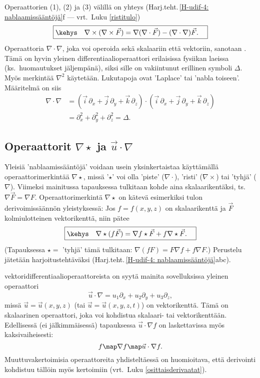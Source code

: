 Operaattorien (1), (2) ja (3) välillä on yhteys
(Harj.teht.\,\ref{H-udif-4: nablaamissääntöjä}f --- vrt.\ Luku \ref{ristitulo})
\[
\boxed{\kehys\quad \nabla\times(\nabla\times\vec F)=\nabla(\nabla\cdot\vec F)
                                                   -(\nabla\cdot\nabla)\vec F. \quad}
\]
Operaattoria $\nabla\cdot\nabla$, joka voi operoida sekä skalaariin että vektoriin, sanotaan 
. Tämä on hyvin yleinen differentiaalioperaattori erilaisissa 
fysiikan laeissa (ks.\ huomautukset jäljempänä), siksi sille on vakiintunut erillinen symboli 
$\Delta$. Myös merkintää $\nabla^2$ käytetään. Lukutapoja ovat 'Laplace' tai 'nabla toiseen'. 
Määritelmä on siis
\begin{align*}
\nabla\cdot\nabla &= (\vec i \, \partial_x+\vec j \, \partial_y +\vec k \, \partial_z)\cdot
                     (\vec i \, \partial_x+\vec j \, \partial_y +\vec k \, \partial_z) \\
                  &=\partial_x^2+\partial_y^2+\partial_z^2=\Delta.
\end{align*}

\subsection{Operaattorit $\nabla\star$ ja $\vec u\cdot\nabla$}

Yleisiä 'nablaamissääntöjä' voidaan usein yksinkertaistaa käyttämällä operaattorimerkintää
$\nabla\star$, missä '$\star$' voi olla 'piste' ($\nabla\cdot$), 'risti' ($\nabla\times$) tai
'tyhjä' ($\nabla$). Viimeksi mainitussa tapauksessa tulkitaan kohde aina skalaarikentäksi,
ts.\ $\nabla\vec F=\nabla F$. Operaattorimerkintä $\nabla\star$ on kätevä esimerkiksi tulon
derivoimissäännön yleistyksessä: Jos $f=f(x,y,z)$ on skalaarikenttä ja $\vec F$
kolmiulotteinen vektorikenttä, niin pätee
\[
\boxed{\kehys\quad \nabla\star(f\vec F)=\nabla f\star\vec F + f\nabla\star\vec F. \quad}
\] 
(Tapauksessa $\star=$ 'tyhjä' tämä tulkitaan: $\nabla(fF)=F\nabla f+f\nabla F$.)
Perustelu jätetään harjoitustehtäväksi (Harj.teht.\,\ref{H-udif-4: nablaamissääntöjä}abc). 

%
 vektoridifferentiaalioperaattoreista on syytä mainita
sovelluksissa yleinen operaattori
\[
\vec u\cdot\nabla  = u_1\partial_x + u_2\partial_y + u_3\partial_z,
\]
missä $\vec u=\vec u(x,y,z)$ (tai $\vec u=\vec u(x,y,z,t)$) on vektorikenttä. Tämä on
skalaarinen operaattori, joka voi kohdistua skalaari- tai vektorikenttään. Edellisessä
(ei jälkimmäisessä) tapauksessa $\vec u\cdot\nabla f$ on laskettavissa myös kaksivaiheisesti:
\[
f \map \nabla f \map \vec u\cdot\nabla f.
\]
Muuttuvakertoimisia operaattoreita yhdisteltäessä on huomioitava, että derivointi kohdistuu 
tällöin myös kertoimiin (vrt.\ Luku \ref{osittaisderivaatat}).

